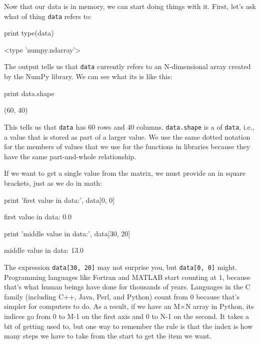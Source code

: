 Now that our data is in memory, we can start doing things with it.
First, let's ask what  of thing
\texttt{data} refers to:

\begin{VerbIn}
print type(data)
\end{VerbIn}

\begin{VerbOut}
<type 'numpy.ndarray'>
\end{VerbOut}

The output tells us that \texttt{data} currently refers to an
N-dimensional array created by the NumPy library. We can see what its
 is like this:

\begin{VerbIn}
print data.shape
\end{VerbIn}

\begin{VerbOut}
(60, 40)
\end{VerbOut}

This tells us that \texttt{data} has 60 rows and 40 columns.
\texttt{data.shape} is a  of \texttt{data},
i.e., a value that is stored as part of a larger value. We use the same
dotted notation for the members of values that we use for the functions
in libraries because they have the same part-and-whole relationship.

If we want to get a single value from the matrix, we must provide an
 in square brackets, just as we do in math:

\begin{VerbIn}
print 'first value in data:', data[0, 0]
\end{VerbIn}

\begin{VerbOut}
first value in data: 0.0
\end{VerbOut}

\begin{VerbIn}
print 'middle value in data:', data[30, 20]
\end{VerbIn}

\begin{VerbOut}
middle value in data: 13.0
\end{VerbOut}

The expression \texttt{data{[}30, 20{]}} may not surprise you, but
\texttt{data{[}0, 0{]}} might. Programming languages like Fortran and
MATLAB start counting at 1, because that's what human beings have done
for thousands of years. Languages in the C family (including C++, Java,
Perl, and Python) count from 0 because that's simpler for computers to
do. As a result, if we have an M${\times}$N array in Python, its indices go from
0 to M-1 on the first axis and 0 to N-1 on the second. It takes a bit of
getting used to, but one way to remember the rule is that the index is
how many steps we have to take from the start to get the item we want.

